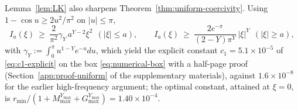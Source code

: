 \begin{remark}\label{rem:coercivity}
Lemma~\ref{lem:LK} also sharpens Theorem~\ref{thm:uniform-coercivity}.  Using $1-\cos u\ge2u^2/\pi^2$
on $|u|\le\pi$,
\[
 I_a(\xi)\ \ge\ \frac{2}{\pi^2}\gamma_Y\,a^{Y-2}\xi^2\ \ (|\xi|\le a),\qquad
 I_a(\xi)\ \ge\ \frac{2e^{-\pi}}{(2-Y)\pi^Y}\,|\xi|^Y\ \ (|\xi|\ge a),
\]
with $\gamma_Y:=\int_0^\pi u^{1-Y}e^{-u}du$, which yield the explicit constant
$c_1=5.1\times10^{-5}$ of \eqref{eq:c1-explicit} on the box \eqref{eq:numerical-box} with a
half-page proof (Section~\ref{app:proof-uniform} of the supplementary materials), against
$1.6\times10^{-8}$ for the earlier high-frequency argument; the optimal constant, attained at
$\xi=0$, is $r_{\min}/(1+M_{\max}^{Y_{\max}}+G_{\max}^{Y_{\max}})=1.40\times10^{-4}$.
\end{remark}
